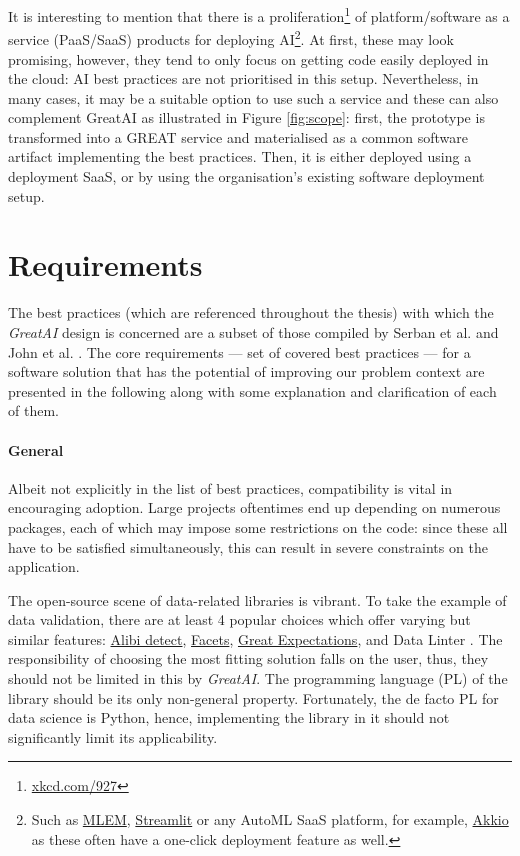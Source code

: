 It is interesting to mention that there is a proliferation\footnote{\href{https://xkcd.com/927/}{xkcd.com/927}} of platform/software as a service (PaaS/SaaS) products for deploying AI\footnote{Such as \href{https://mlem.ai/}{MLEM}, \href{https://streamlit.io/cloud}{Streamlit} or any AutoML SaaS platform, for example, \href{https://www.akkio.com/role/software-engineers}{Akkio} as these often have a one-click deployment feature as well.}. At first, these may look promising, however, they tend to only focus on getting code easily deployed in the cloud: AI best practices are not prioritised in this setup. Nevertheless, in many cases, it may be a suitable option to use such a service and these can also complement GreatAI as illustrated in Figure \ref{fig:scope}: first, the prototype is transformed into a GREAT service and materialised as a common software artifact implementing the best practices. Then, it is either deployed using a deployment SaaS, or by using the organisation's existing software deployment setup.

\section{Requirements} \label{section:requirements}

The best practices (which are referenced throughout the thesis) with which the \textit{GreatAI} design is concerned are a subset of those compiled by Serban et al. \cite{serban2020adoption} and John et al. \cite{john2020architecting}. The core requirements --- set of covered best practices --- for a software solution that has the potential of improving our problem context are presented in the following along with some explanation and clarification of each of them.

\paragraph{General} Albeit not explicitly in the list of best practices, compatibility is vital in encouraging adoption. Large projects oftentimes end up depending on numerous packages, each of which may impose some restrictions on the code: since these all have to be satisfied simultaneously, this can result in severe constraints on the application. 

The open-source scene of data-related libraries is vibrant. To take the example of data validation, there are at least 4 popular choices which offer varying but similar features: \href{https://github.com/SeldonIO/alibi-detect}{Alibi detect}, \href{https://github.com/PAIR-code/facets}{Facets}, \href{https://github.com/great-expectations/great_expectations}{Great Expectations}, and Data Linter \cite{hynes2017data}. The responsibility of choosing the most fitting solution falls on the user, thus, they should not be limited in this by \textit{GreatAI}. The programming language (PL) of the library should be its only non-general property. Fortunately, the de facto PL for data science is Python, hence, implementing the library in it should not significantly limit its applicability.

